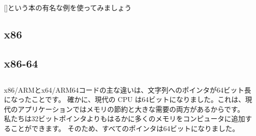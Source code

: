 \mysection{\HelloWorldSectionName}
\label{sec:helloworld}

[\KRBook]という本の有名な例を使ってみましょう



\subsection{x86}





\subsection{x86-64}








\subsection{\Conclusion{}}

x86/ARMとx64/ARM64コードの主な違いは、文字列へのポインタが64ビット長になったことです。
確かに、現代の \ac{CPU} は64ビットになりました。これは、現代のアプリケーションではメモリの節約と大きな需要の両方があるからです。
私たちは32ビットポインタよりもはるかに多くのメモリをコンピュータに追加することができます。
そのため、すべてのポインタは64ビットになりました。


